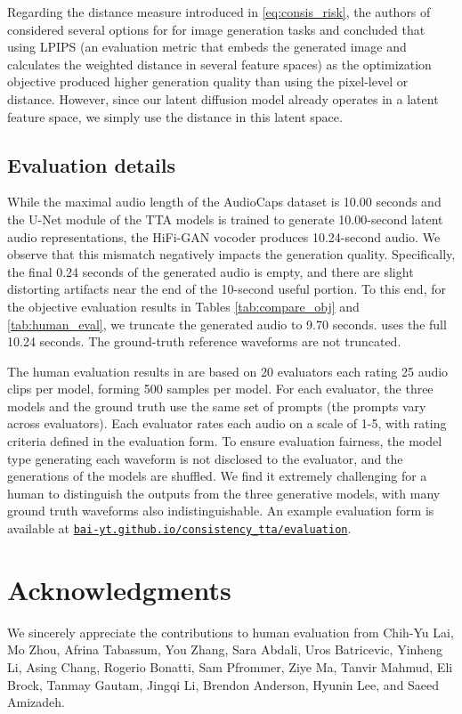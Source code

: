 \documentclass{article}
\begin{document}
Regarding the distance measure  introduced in \cref{eq:consis_risk}, the authors of \cite{cm} considered several options for  for image generation tasks and concluded that using LPIPS (an evaluation metric that embeds the generated image and calculates the weighted distance in several feature spaces) as the optimization objective produced higher generation quality than using the pixel-level  or  distance. However, since our latent diffusion model already operates in a latent feature space, we simply use the  distance in this latent space.


\subsection{Evaluation details} \label{sec:human_details}

While the maximal audio length of the AudioCaps dataset is 10.00 seconds and the U-Net module of the TTA models is trained to generate 10.00-second latent audio representations, the HiFi-GAN vocoder produces 10.24-second audio. We observe that this mismatch negatively impacts the generation quality. Specifically, the final 0.24 seconds of the generated audio is empty, and there are slight distorting artifacts near the end of the 10-second useful portion. To this end, for the objective evaluation results in Tables \ref{tab:compare_obj} and \ref{tab:human_eval}, we truncate the generated audio to 9.70 seconds.  uses the full 10.24 seconds. The ground-truth reference waveforms are not truncated.

The human evaluation results in  are based on 20 evaluators each rating 25 audio clips per model, forming 500 samples per model. For each evaluator, the three models and the ground truth use the same set of prompts (the prompts vary across evaluators). Each evaluator rates each audio on a scale of 1-5, with rating criteria defined in the evaluation form. To ensure evaluation fairness, the model type generating each waveform is not disclosed to the evaluator, and the generations of the models are shuffled. We find it extremely challenging for a human to distinguish the outputs from the three generative models, with many ground truth waveforms also indistinguishable. An example evaluation form is available at \href{https://bai-yt.github.io/consistency_tta/evaluation.html}{\texttt{bai-yt.github.io/consistency\_tta/evaluation}}.



\section{Acknowledgments}

We sincerely appreciate the contributions to human evaluation from Chih-Yu Lai, Mo Zhou, Afrina Tabassum, You Zhang, Sara Abdali, Uros Batricevic, Yinheng Li, Asing Chang, Rogerio Bonatti, Sam Pfrommer, Ziye Ma, Tanvir Mahmud, Eli Brock, Tanmay Gautam, Jingqi Li, Brendon Anderson, Hyunin Lee, and Saeed Amizadeh.
\end{document}
